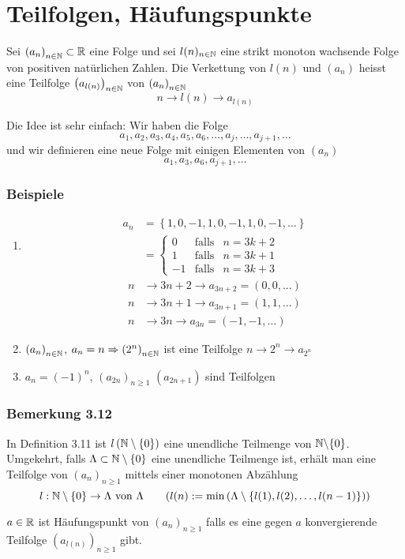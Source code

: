 \section{Teilfolgen, Häufungspunkte}
\begin{definition}{3.11}
Sei $\left( a_n\right)_{n\in\mathbb{N}}\subset\mathbb{R}$ eine Folge und sei $l(n)_{n\in\mathbb{N}}$ eine strikt monoton wachsende Folge von positiven natürlichen Zahlen. Die Verkettung von $l(n)$ und $\left( a_n\right)$ heisst eine Teilfolge $\left( a_{l(n)}\right)_{n\in\mathbb{N}}$ von $\left( a_{n}\right)_{n\in\mathbb{N}}$
\[n\to l(n)\to a_{l(n)}\]
\end{definition}
Die Idee ist sehr einfach: Wir haben die Folge \[a_1,a_2,a_3,a_4,a_5,a_6,\dots,a_j,\dots,a_{j+1},\dots \]
und wir definieren eine neue Folge mit einigen Elementen von $\left( a_n\right)$
\[a_1,a_3,a_6,a_{j+1},\dots \]

\subsubsection*{Beispiele}
\begin{enumerate}
\item \begin{align*}
{a_n} &=\left\{ {1,0, - 1,1,0, - 1,1,0, - 1, \ldots } \right\}\\
 &=\left\{ {\begin{array}{*{20}{c}}
0&{{\text{falls}}}&{n = 3k + 2}\\
1&{{\text{falls}}}&{n = 3k + 1}\\
{ - 1}&{{\text{falls}}}&{n = 3k + 3}
\end{array}} \right.
\end{align*}
\begin{align*}
n&\to 3n + 2 \to {a_{3n + 2}} = \left( {0,0, \ldots } \right)\\
n&\to 3n + 1 \to {a_{3n + 1}} = \left( {1,1, \ldots } \right)\\
n&\to 3n \to {a_{3n}} = \left( { - 1, - 1, \ldots } \right)
\end{align*}
\item $\left( a_n\right)_{n\in\mathbb{N}}$, $a_n=n\Rightarrow \left( 2^n\right)_{n\in\mathbb{N}}$ ist eine Teilfolge $n\to 2^n\to a_{2^n}$
\item $a_n=\left( -1\right)^n$, $\left( a_{2n}\right)_{n\geq 1}$ $\left( a_{2n+1}\right)$ sind Teilfolgen
\end{enumerate}

\subsubsection*{Bemerkung 3.12}
In Definition 3.11 ist $l\left( \mathbb{N}\setminus\{ 0\}\right)$ eine unendliche Teilmenge von $\mathbb{N}\backslash\{ 0\}$. Umgekehrt, falls $\Lambda\subset\mathbb{N}\setminus\{ 0\}$ eine unendliche Teilmenge ist, erhält man eine Teilfolge von $\left( a_n\right)_{n\geq 1}$ mittels einer monotonen Abzählung \[l:\mathbb{N}\setminus\{ 0\}\to\Lambda \text{ von } \Lambda \quad\quad (l(n):=\min\left( \Lambda \setminus\{ l(1),l(2),\dots ,l(n-1)\}\right)) \]
\begin{definition}{3.13}
$a\in\mathbb{R}$ ist Häufungspunkt von $\left( a_n\right)_{n\geq 1}$ falls es eine gegen $a$ konvergierende Teilfolge $\left( a_{l(n)}\right)_{n\geq 1}$ gibt.
\end{definition}
